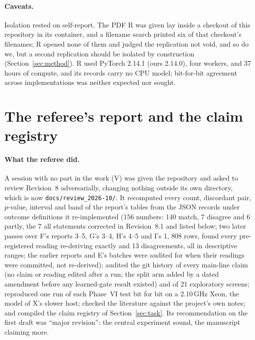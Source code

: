 \documentclass[11pt]{article}
\begin{document}
\paragraph{Caveats.} Isolation rested on self-report. The PDF R was given lay inside a checkout of this repository in its container, and a filename search printed six of that checkout's filenames; R opened none of them and judged the replication not void, and so do we, but a second replication should be isolated by construction (Section~\ref{sec:method}). R used PyTorch 2.14.1 (ours 2.14.0), four workers, and 37 hours of compute, and its records carry no CPU model; bit-for-bit agreement across implementations was neither expected nor sought.

\section{The referee's report and the claim registry}
\label{sec:referee}

\paragraph{What the referee did.} A session with no part in the work (V) was given the repository and asked to review Revision~8 adversarially, changing nothing outside its own directory, which is now \texttt{docs/review\_2026-10/}. It recomputed every count, discordant pair, $p$-value, interval and band of the report's tables from the JSON records under outcome definitions it re-implemented (156 numbers: 140 match, 7 disagree and 6 partly, the 7 all statements corrected in Revision~8.1 and listed below; two later passes over F's reports 3--5, G's 3--4, H's 4--5 and I's 1, 808 rows, found every pre-registered reading re-deriving exactly and 13 disagreements, all in descriptive ranges; the earlier reports and E's batches were audited for when their readings were committed, not re-derived); audited the git history of every main-line claim (no claim or reading edited after a run; the split arm added by a dated amendment before any learned-gate result existed) and of 21 exploratory screens; reproduced one run of each Phase~VI test bit for bit on a 2.10\,GHz Xeon, the model of X's slower host; checked the literature against the project's own notes; and compiled the claim registry of Section~\ref{sec:task}. Its recommendation on the first draft was ``major revision'': the central experiment sound, the manuscript claiming more.
\end{document}

